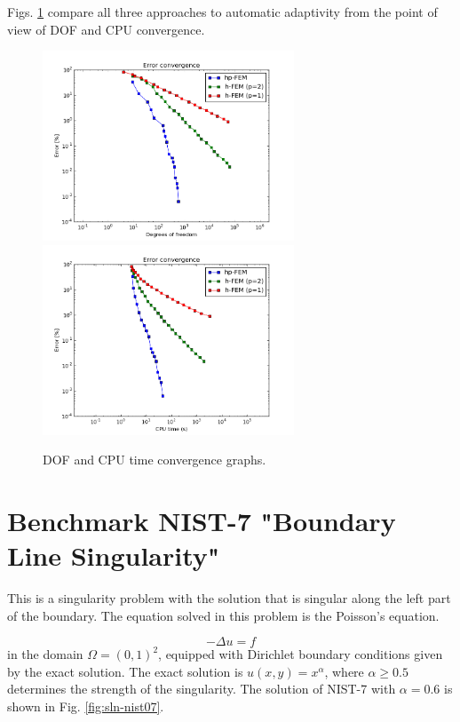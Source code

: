 \documentclass[12pt]{elsarticle}
\begin{document}
Figs. \ref{fig:nist-6-conv} compare all
three approaches to automatic adaptivity from the point
of view of DOF and CPU convergence.
\vspace{-2mm}

\begin{figure}[H]
\centering
\vspace{-2mm}
\hspace{-50mm}
\includegraphics[width=7.5cm]{nist/nist-6/conv_dof_aniso.png}\ \
\hspace{-10mm}
\includegraphics[width=7.5cm]{nist/nist-6/conv_cpu_aniso.png}
\hspace{-50mm}
\caption{DOF and CPU time convergence graphs.}
\label{fig:nist-6-conv}
\end{figure}


\section{Benchmark NIST-7 "Boundary Line Singularity"}
\label{sec:bench-7}

This is a singularity problem with the solution that is singular along the left part of the boundary.
The equation solved in this problem is the Poisson's equation.

\begin{equation} \label{boundary-line-singularity}
-\Delta u = f
\end{equation}
in the domain $\Omega = (0, 1)^2$, equipped with Dirichlet boundary conditions
given by the exact solution. The exact solution is
$u(x,y) = x^{\alpha}$,
where $\alpha \geq 0.5$ determines the strength of the singularity.
The solution of NIST-7 with $\alpha = 0.6$ is shown in Fig. \ref{fig:sln-nist07}.
\end{document}
